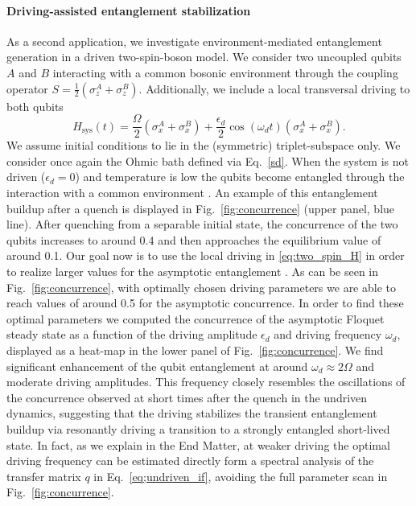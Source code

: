\documentclass[aps,prb, twocolumn,superscriptaddress]{revtex4-2}
\begin{document}
\paragraph*{Driving-assisted entanglement stabilization}
As a second application, we investigate environment-mediated entanglement generation in a driven two-spin-boson model. We consider two uncoupled qubits ${A}$ and ${B}$ interacting with a common bosonic environment through the coupling operator $S=\frac{1}{2} (\sigma_z^A + \sigma_z^B)$. Additionally, we include a local transversal driving to both qubits
\begin{equation} \label{eq:two_spin_H}
    H_\mathrm{sys}(t) = \frac{\Omega}{2} (\sigma_x^A + \sigma_x^B) +\frac{\epsilon_d}{2}\cos(\omega_d t) (\sigma_x^A + \sigma_x^B).
\end{equation}
We assume initial conditions to lie in the (symmetric) triplet-subspace only. We consider once again the Ohmic bath defined via Eq.~\eqref{sd}. When the system is not driven ($\epsilon_d=0$) and temperature is low the qubits become entangled through the interaction with a common environment \cite{Hartmann2020Oct}. An example of this entanglement buildup after a quench is displayed in Fig.~\ref{fig:concurrence} (upper panel, blue line). After quenching from a separable initial state, the concurrence of the two qubits increases to around 0.4 and then approaches the equilibrium value of around 0.1. Our goal now is to use the local driving in \eqref{eq:two_spin_H} in order to realize larger values for the asymptotic entanglement \cite{Patrick2010, Schwartz2016}. As can be seen in Fig.~\ref{fig:concurrence}, with optimally chosen driving parameters we are able to reach values of around 0.5 for the asymptotic concurrence. In order to find these optimal parameters we computed the concurrence of the asymptotic Floquet steady state as a function of the driving amplitude $\epsilon_d$ and driving frequency $\omega_d$, displayed as a heat-map in the lower panel of Fig.~\ref{fig:concurrence}. We find significant enhancement of the qubit entanglement at around $\omega_d\approx2\Omega$ and moderate driving amplitudes. This frequency closely resembles the oscillations of the concurrence observed at short times after the quench in the undriven dynamics, suggesting that the driving stabilizes the transient entanglement buildup via resonantly driving a transition to a strongly entangled short-lived state. In fact, as we explain in the End Matter, at weaker driving the optimal driving frequency can be estimated directly form a spectral analysis \cite{Link2024May, sonner2025Semi} of the transfer matrix $q$ in Eq.~\eqref{eq;undriven_if}, avoiding the full parameter scan in Fig.~\ref{fig:concurrence}.
\end{document}
